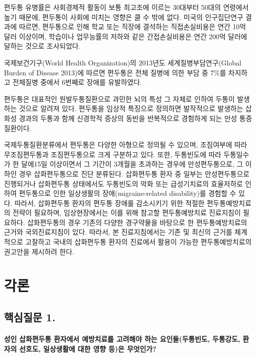 \documentclass[]{book}
\begin{document}
편두통 유병률은 사회경제적 활동이 보통 최고조에 이르는 30대부터 50대의 연령에서 높기 때문에, 편두통이 사회에 미치는 영향은 클 수 밖에 없다. 미국의 인구집단연구 결과에 따르면, 편두통으로 인해 학교 또는 직장에 결석하는 직접손실비용은 연간 10억 달러 이상이며, 학습이나 업무능률의 저하와 같은 간접손실비용은 연간 200억 달러에 달하는 것으로 조사되었다.

국제보건기구(World Health Organization)의 2013년도 세계질병부담연구(Global Burden of Disease 2013)에 따르면 편두통은 전체 질병에 의한 부담 중 7\%를 차지하고 전체질병 중에서 6번째로 장애를 유발하였다.

편두통은 대표적인 원발두통질환으로 과민한 뇌의 특성 그 자체로 인하여 두통이 발생하는 것으로 알려져 있다. 편두통을 임상적 특징으로 정의하면 발작적으로 발생하는 삽화성 경과의 두통과 함께 신경학적 증상의 동반을 반복적으로 경험하게 되는 만성 통증질환이다.

국제두통질환분류에서 편두통은 다양한 아형으로 정의될 수 있으며, 조짐여부에 따라 무조짐편두통과 조짐편두통으로 크게 구분하고 있다. 또한, 두통빈도에 따라 두통일수가 한 달에15일 이상이면서 그 기간이 3개월을 초과하는 경우에 만성편두통으로, 그 이하인 경우 삽화편두통으로 진단 분류된다. 삽화편두통 환자 중 일부는 만성편두통으로 진행되거나 삽화편두통 상태에서도 두통빈도의 악화 또는 급성기치료의 효율저하로 인하여 편두통으로 인한 일상생활의 장애(migraine-related disability)를 경험할 수 있다. 따라서, 삽화편두통 환자의 편두통 장애룰 감소시키기 위한 적절한 편두통예방치료의 전략이 필요하며, 임상현장에서는 이를 위해 참고할 편두통예방치료 진료지침이 필요하다. 삽화편두통의 경우 기존의 다양한 경구약물을 바탕으로 한 편두통예방치료의 근거와 국외진료지침이 있다. 따라서, 본 진료지침에서는 기존 및 최신의 근거를 체계적으로 고찰하고 국내의 삽화편두통 환자의 진료에서 활용이 가능한 편두통예방치료의 권고안을 제시하려 한다.

\hypertarget{section-6}{%
\chapter{각론}\label{section-6}}

\hypertarget{section-7}{%
\section{핵심질문 1.}\label{section-7}}

\hypertarget{section-8}{%
\subsubsection*{성인 삽화편두통 환자에서 예방치료를 고려해야 하는 요인들(두통빈도, 두통강도, 환자의 선호도, 일상생활에 대한 영향 등)은 무엇인가?}\label{section-8}}
\end{document}
